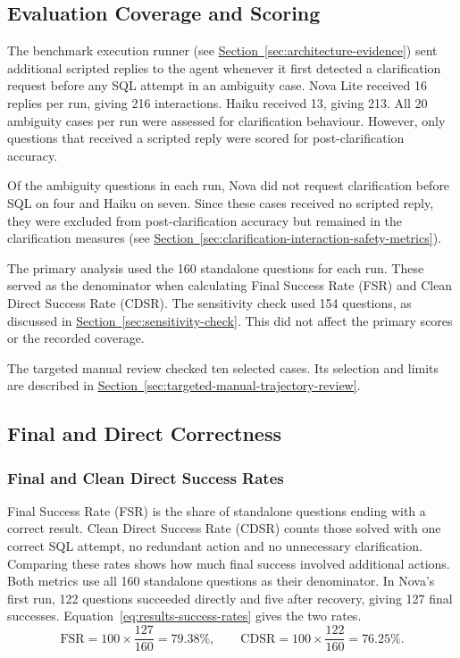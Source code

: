 \subsection{Evaluation Coverage and Scoring}

The benchmark execution runner 
(see \hyperref[sec:architecture-evidence]{Section~\ref*{sec:architecture-evidence}}) 
sent additional scripted replies to the agent whenever it first detected a clarification request before any
SQL attempt in an ambiguity case. 
Nova Lite received 16 replies per run, giving 216 interactions. 
Haiku received 13, giving 213. 
All 20 ambiguity cases per run were assessed for clarification behaviour. 
However, only questions that received a scripted reply were scored for post-clarification accuracy.

Of the ambiguity questions in each run, 
Nova did not request clarification before SQL 
on four and Haiku on seven. 
Since these cases received no scripted reply, 
they were excluded from post-clarification accuracy 
but remained in the clarification measures 
(see \hyperref[sec:clarification-interaction-safety-metrics]{Section~\ref*{sec:clarification-interaction-safety-metrics}}).

The primary analysis used the 160 standalone questions for each run. 
These served as the denominator when calculating Final Success Rate (FSR) 
and Clean Direct Success Rate (CDSR).
The sensitivity check used 154 questions, as discussed in 
\hyperref[sec:sensitivity-check]{Section~\ref*{sec:sensitivity-check}}. 
This did not affect the primary scores or the recorded coverage.

The targeted manual review checked ten selected cases.
Its selection and limits are described in 
\hyperref[sec:targeted-manual-trajectory-review]{Section~\ref*{sec:targeted-manual-trajectory-review}}.

\subsection{Final and Direct Correctness}
\label{sec:results-correctness}

\subsubsection{Final and Clean Direct Success Rates}

Final Success Rate (FSR) is the share of standalone questions ending with a
correct result. Clean Direct Success Rate (CDSR) counts those solved with one
correct SQL attempt, no redundant action and no unnecessary clarification.
Comparing these rates shows how much final success involved additional actions.
Both metrics use all 160 standalone questions as their denominator. In Nova's first
run, 122 questions succeeded directly and five after recovery, giving
127 final successes. Equation~\ref{eq:results-success-rates} gives the two rates.
\begin{equation}
\label{eq:results-success-rates}
\mathrm{FSR} = 100 \times \frac{127}{160} = 79.38\%, \qquad
\mathrm{CDSR} = 100 \times \frac{122}{160} = 76.25\%.
\end{equation}

